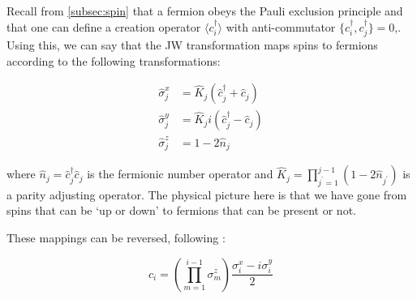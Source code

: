 Recall from \ref{subsec:spin} that a fermion obeys the Pauli exclusion principle and that one can define a creation operator $\langle c_i^\dagger \rangle$ with anti-commutator $\{c_i^\dagger, c_j^\dagger\} = 0$,. Using this, we can say that the JW transformation maps spins to fermions according to the following transformations: 

\begin{align}
	\hat{\sigma}_j^x &=\hat{K}_j\left(\hat{c}_j^{\dagger}+\hat{c}_j\right) \\
	\hat{\sigma}_j^y &=\hat{K}_j i\left(\hat{c}_j^{\dagger}-\hat{c}_j\right) \\
	\hat{\sigma}_j^z &=1-2 \hat{n}_j
\end{align}




where $\hat{n}_j=\hat{c}_j^{\dagger} \hat{c}_j$ is the fermionic number operator and $\hat{K}_j=\prod_{j^{\prime}=1}^{j-1}\left(1-2 \hat{n}_{j^{\prime}}\right)$ is a parity adjusting operator. The physical picture here is that we have gone from spins that can be `up or down' to fermions that can be present or not. 


These mappings can be reversed, following \cite{paola2016}:

\begin{equation}\label{eq:jw_to_fermions}
c_i=\left(\prod_{m=1}^{i-1} \sigma_m^z\right) \frac{\sigma_i^x-i \sigma_i^y}{2}
\end{equation}

